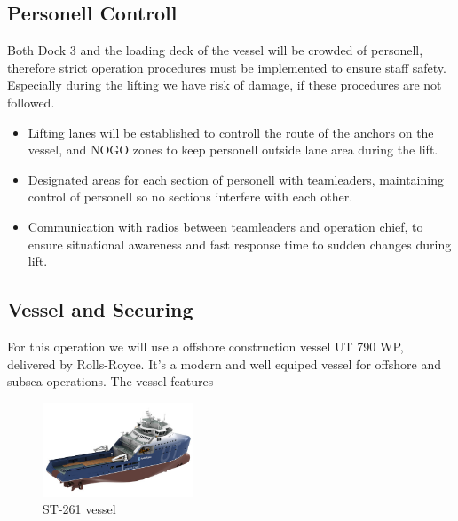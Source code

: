 \documentclass[a4paper,norsk]{article}
\begin{document}
\subsection*{Personell Controll}
Both Dock 3 and the loading deck of the vessel will be crowded of personell, therefore strict operation procedures must be implemented to ensure staff safety. Especially during the lifting we have risk of damage, if these procedures are not followed. 

\begin{itemize}
\item Lifting lanes will be established to controll the route of the anchors on the vessel, and NOGO zones to keep personell outside lane area during the lift.  
\item Designated areas for each section of personell with teamleaders, maintaining control of personell so no sections interfere with each other. 
\item Communication with radios between teamleaders and operation chief, to ensure situational awareness and fast response time to sudden changes during lift. 
\end{itemize}

\subsection*{Vessel and Securing}

For this operation we will use a offshore construction vessel UT 790 WP, delivered by Rolls-Royce. It's a modern and well equiped vessel for offshore and subsea operations. The vessel features \\
\begin{figure}
  \vspace{-20pt}
  \begin{center}
    \includegraphics[width=0.4\textwidth]{wessel.jpg}
  \end{center} 
  \vspace{-20pt}
  \caption{ST-261 vessel}
  \vspace{-10pt}
\end{figure}
\end{document}
